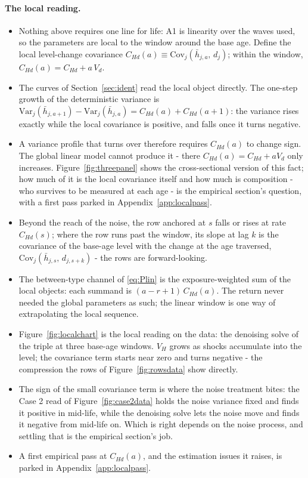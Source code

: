 \documentclass[11pt]{article}
\theoremstyle{remark}
\newcommand{\Var}{\mathrm{Var}}
\newcommand{\Cov}{\mathrm{Cov}}
\begin{document}
\paragraph{The local reading.}
\begin{itemize}
\item Nothing above requires one line for life: A1 is linearity over the waves used, so the parameters are local to the window around the base age.
Define the local level-change covariance $C_{Hd}(a)\equiv\Cov_j(\bar h_{j,a},\,d_j)$; within the window, $C_{Hd}(a)=C_{Hd}+a\,V_d$.
\item The curves of Section~\ref{sec:ident} read the local object directly.
The one-step growth of the deterministic variance is $\Var_j(\bar h_{j,a+1})-\Var_j(\bar h_{j,a})=C_{Hd}(a)+C_{Hd}(a+1)$: the variance rises exactly while the local covariance is positive, and falls once it turns negative.
\item A variance profile that turns over therefore requires $C_{Hd}(a)$ to change sign.
The global linear model cannot produce it - there $C_{Hd}(a)=C_{Hd}+aV_d$ only increases.
Figure~\ref{fig:threepanel} shows the cross-sectional version of this fact; how much of it is the local covariance itself and how much is composition - who survives to be measured at each age - is the empirical section's question, with a first pass parked in Appendix~\ref{app:localpass}.
\item Beyond the reach of the noise, the row anchored at $s$ falls or rises at rate $C_{Hd}(s)$; where the row runs past the window, its slope at lag $k$ is the covariance of the base-age level with the change at the age traversed, $\Cov_j(\bar h_{j,s},\,d_{j,s+k})$ - the rows are forward-looking.
\item The between-type channel of \eqref{eq:Plin} is the exposure-weighted sum of the local objects: each summand is $(a-r+1)\,C_{Hd}(a)$.
The return never needed the global parameters as such; the linear window is one way of extrapolating the local sequence.
\item Figure~\ref{fig:localchart} is the local reading on the data: the denoising solve of the triple at three base-age windows.
$V_H$ grows as shocks accumulate into the level; the covariance term starts near zero and turns negative - the compression the rows of Figure~\ref{fig:rowsdata} show directly.
\item The sign of the small covariance term is where the noise treatment bites: the Case 2 read of Figure~\ref{fig:case2data} holds the noise variance fixed and finds it positive in mid-life, while the denoising solve lets the noise move and finds it negative from mid-life on.
Which is right depends on the noise process, and settling that is the empirical section's job.
\item A first empirical pass at $C_{Hd}(a)$, and the estimation issues it raises, is parked in Appendix~\ref{app:localpass}.
\end{itemize}
\end{document}
